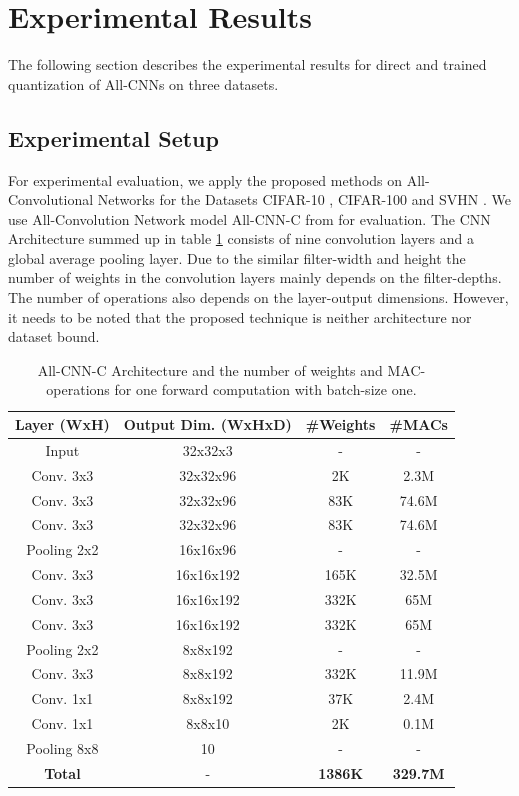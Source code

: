 \section{Experimental Results}
The following section describes the experimental results for direct and trained quantization of All-CNNs on three datasets.

\subsection{Experimental Setup}
For experimental evaluation, we apply the proposed methods on All-Convolutional Networks for the Datasets CIFAR-10 \cite{Krizhevsky2009}, CIFAR-100 and SVHN \cite{netzer2011reading}. We use All-Convolution Network model All-CNN-C from \cite{Springenberg2015} for evaluation. The CNN Architecture summed up in table \ref{tab:allconv} consists of nine convolution layers and a global average pooling layer. Due to the similar filter-width and height the number of weights in the convolution layers mainly depends on the filter-depths. The number of operations also depends on the layer-output dimensions. However, it needs to be 
noted that the proposed technique is neither architecture nor dataset bound. 

\begin{table}[ht!]
  \caption{All-CNN-C Architecture and the number of weights and MAC-operations for one forward computation with batch-size one.}
  \label{tab:allconv}
  \begin{tabular}{c|c|c|c}
    \toprule
    	\textbf{Layer (WxH) }& \textbf{Output Dim. (WxHxD) }& \textbf{\#Weights} & \textbf{\#MACs} \\
    \midrule
    	Input &  32x32x3 & - & - \\
    	Conv. 3x3 &  32x32x96 & 2K & 2.3M \\
    	Conv. 3x3 &  32x32x96 & 83K & 74.6M\\
    	Conv. 3x3 &  32x32x96 & 83K & 74.6M\\
    	Pooling 2x2 &  16x16x96 & - & -\\
    	Conv. 3x3 &  16x16x192 & 165K & 32.5M\\
    	Conv. 3x3 &  16x16x192 & 332K & 65M\\
    	Conv. 3x3 &  16x16x192 & 332K & 65M\\
    	Pooling 2x2 &  8x8x192 & - & -\\
    	Conv. 3x3 &  8x8x192 & 332K & 11.9M\\
    	Conv. 1x1 &  8x8x192 & 37K & 2.4M\\
    	Conv. 1x1 &  8x8x10 & 2K & 0.1M\\
    	Pooling 8x8 &  10 & - & -\\
            \midrule
    	\textbf{Total}&  - & \textbf{1386K} & \textbf{329.7M} \\
  \bottomrule
\end{tabular}
\end{table}

